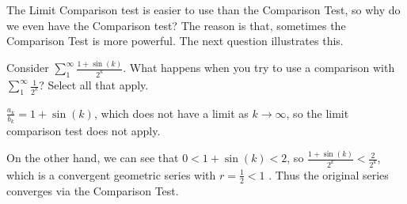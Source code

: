 \documentclass{ximera}
\begin{document}
The Limit Comparison test is easier to use than the Comparison Test, so why do we even have the Comparison test?  The reason is that, sometimes the Comparison Test is more powerful.  The next question illustrates this.

\begin{question}
	Consider $\sum_1^\infty \frac{1+\sin(k)}{2^k}$.  What happens when you try to use a comparison with $\sum_1^\infty \frac{1}{2^k}$?  Select all that apply.
	
		\begin{selectAll}
		\end{selectAll}
		
		\begin{hint}
				$\frac{a_k}{b_k} = 1+\sin(k)$, which does not have a limit as $k \to \infty$, so the limit comparison test does not apply.
				
				On the other hand, we can see that $0<1+\sin(k)<2$, so $\frac{1+\sin(k)}{2^k} < \frac{2}{2^k}$, which is a convergent geometric series with $r = \frac{1}{2}<1$ .  Thus the original series converges via the Comparison Test.
		\end{hint}
		
\end{question}
\end{document}
